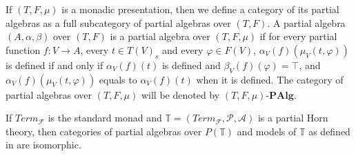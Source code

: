 \documentclass[reqno]{amsart}
\theoremstyle{definition}
\theoremstyle{remark}
\newcommand{\cat}[1]{\mathbf{#1}}
\newcommand{\PAlg}[1]{#1\text{-}\cat{PAlg}}
\numberwithin{figure}{section}
\begin{document}
If $(T,F,\mu)$ is a monadic presentation, then we define a category of its partial algebras as a full subcategory of partial algebras over $(T,F)$.
A partial algebra $(A,\alpha,\beta)$ over $(T,F)$ is a partial algebra over $(T,F,\mu)$ if for every partial function $f : V \to A$,
    every $t \in T(V)_s$ and every $\varphi \in F(V)$, $\alpha_V(f)(\mu_V(t,\varphi))$ is defined if and only if $\alpha_V(f)(t)$ is defined and $\beta_V(f)(\varphi) = \top$,
    and $\alpha_V(f)(\mu_V(t,\varphi))$ equals to $\alpha_V(f)(t)$ when it is defined.
The category of partial algebras over $(T,F,\mu)$ will be denoted by $\PAlg{(T,F,\mu)}$.

\begin{lem}
If $Term_\mathcal{F}$ is the standard monad and $\mathbb{T} = (Term_\mathcal{F},\mathcal{P},\mathcal{A})$ is a partial Horn theory,
    then categories of partial algebras over $P(\mathbb{T})$ and models of $\mathbb{T}$ as defined in \cite{PHL} are isomorphic.
\end{lem}
\end{document}
